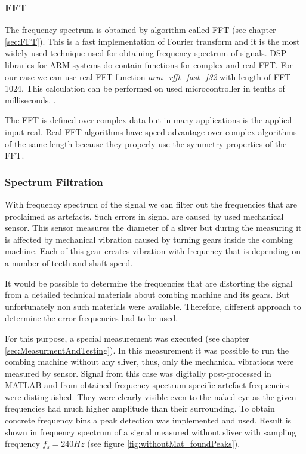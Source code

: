 \documentclass[twoside]{ctuthesis}
\theoremstyle{plain}
\theoremstyle{definition}
\theoremstyle{note}
\begin{document}
\subsubsection{FFT}
The frequency spectrum is obtained by algorithm called FFT (see chapter \ref{sec:FFT}). This is a fast implementation of Fourier transform and it is the most widely used technique used for obtaining frequency spectrum of signals. DSP libraries for ARM systems do contain functions for complex and real FFT. For our case we can use real FFT function \textit{arm\_rfft\_fast\_f32} with length of FFT 1024. This calculation can be performed on used microcontroller in tenths of milliseconds. \cite{cite:STM32_DSP_library}.

The FFT is defined over complex data but in many applications is the applied input real. Real FFT algorithms have speed advantage over complex algorithms of the same length because they properly use the symmetry properties of the FFT.

\subsubsection{Spectrum Filtration}
\label{sec:spectrumFiltration}
With frequency spectrum of the signal we can filter out the frequencies that are proclaimed as artefacts. Such errors in signal are caused by used mechanical sensor. This sensor measures the diameter of a sliver but during the measuring it is affected by mechanical vibration caused by turning gears inside the combing machine. Each of this gear creates vibration with frequency that is depending on a number of teeth and shaft speed. 

It would be possible to determine the frequencies that are distorting the signal from a detailed technical materials about combing machine and its gears. But unfortunately non such materials were available. Therefore, different approach to determine the error frequencies had to be used. 

For this purpose, a special measurement was executed (see chapter \ref{sec:MeasurmentAndTesting}). In this measurement it was possible to run the combing machine without any sliver, thus, only the mechanical vibrations were measured by sensor. Signal from this case was digitally post-processed in MATLAB and from obtained frequency spectrum specific artefact frequencies were distinguished. They were clearly visible even to the naked eye as the given frequencies had much higher amplitude than their surrounding. To obtain concrete frequency bins a peak detection was implemented and used. Result is shown in frequency spectrum of a signal measured without sliver with sampling frequency $f_s=240Hz$ (see figure \ref{fig:withoutMat_foundPeaks}).
\end{document}
